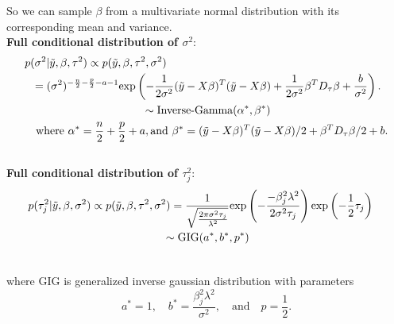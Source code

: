 So we can sample $\beta$ from a multivariate normal distribution with its corresponding mean and variance.\\
\textbf{Full conditional distribution of $\sigma^2$}:\\
\begin{equation}
	\begin{multlined}
		p(\sigma^2|\tilde{y},\beta,\tau^2) \propto  	p(\tilde{y},\beta,\tau^2,\sigma^2)  \\
		= (\sigma^2)^{-\frac{n}{2}-\frac{p}{2}-a-1}\textnormal{exp}\left(-\frac{1}{2\sigma^2}(\tilde{y}-X\beta)^T(\tilde{y}-X\beta)+\frac{1}{2\sigma^2}\beta^TD_{\tau}\beta+\frac{b}{\sigma^2} \right).\\
		\sim \textnormal{Inverse-Gamma}(\alpha^*,\beta^*)\\
		\textnormal{where } \alpha^* = \frac{n}{2}+\frac{p}{2}+a, \textnormal{and } \beta^* = 
		(\tilde{y}-X\beta)^T(\tilde{y}-X\beta)/2 + \beta^TD_{\tau}\beta/2 +b.
	\end{multlined}
\end{equation}\\
\textbf{Full conditional distribution of $\tau_j^2$}:
\begin{equation}
	\begin{multlined}
		p(\tau_j^2|\tilde{y},\beta,\sigma^2) \propto  	p(\tilde{y},\beta,\tau^2,\sigma^2)  
		= \frac{1}{\sqrt{\frac{2\pi\sigma^2\tau_j}{\lambda^2}}}\textnormal{exp}\left(-\frac{-\beta_j^2\lambda^2}{2\sigma^2\tau_j} \right)\textnormal{exp}\left(-\frac{1}{2}\tau_j \right)\\
		\sim \text{GIG}(a^*,b^*,p^*)\\
	\end{multlined}
\end{equation}

where GIG is generalized inverse gaussian distribution with parameters 
$$
a^* = 1, \quad b^* = \frac{\beta_j^2\lambda^2}{\sigma^2}, \quad \mbox{and} \quad p = \frac{1}{2}.
$$

